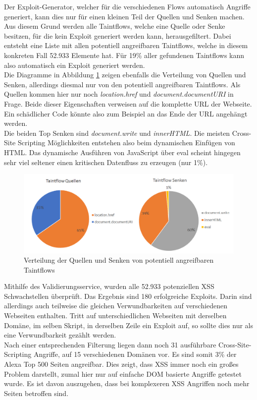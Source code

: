 Der Exploit-Generator, welcher für die verschiedenen Flows automatisch Angriffe generiert, kann dies nur für einen kleinen Teil der Quellen und Senken machen. Aus diesem Grund werden alle Taintflows, welche eine Quelle oder Senke besitzen, für die kein Exploit generiert werden kann, herausgefiltert. Dabei entsteht eine Liste mit allen potentiell angreifbaren Taintflows, welche in diesem konkreten Fall 52.933 Elemente hat. Für 19\% aller gefundenen Taintflows kann also automatisch ein Exploit generiert werden. \\
Die Diagramme in Abbildung \ref{fig:VerteilungQuellenSenkenAngreifbar} zeigen ebenfalls die Verteilung von Quellen und Senken, allerdings diesmal nur von den potentiell angreifbaren Taintflows. Als Quellen kommen hier nur noch \textit{location.href} und \textit{document.documentURI} in Frage. Beide dieser Eigenschaften verweisen auf die komplette URL der Webseite. Ein schädlicher Code könnte also zum Beispiel an das Ende der URL angehängt werden. \\
Die beiden Top Senken sind \textit{document.write} und \textit{innerHTML}. Die meisten Cross-Site Scripting Möglichkeiten entstehen also beim dynamischen Einfügen von HTML. Das dynamische Ausführen von JavaScript über eval scheint hingegen sehr viel seltener einen kritischen Datenfluss zu erzeugen (nur 1\%). 

\begin{figure}[h]
	\centering
	\includegraphics[width=1\textwidth]{Bilder/Diagram2.png}
	\caption{Verteilung der Quellen und Senken von potentiell angreifbaren Taintflows}
	\label{fig:VerteilungQuellenSenkenAngreifbar}
\end{figure}

Mithilfe des Validierungsservice, wurden alle 52.933 potenziellen XSS Schwachstellen überprüft. Das Ergebnis sind 180 erfolgreiche Exploits. Darin sind allerdings auch teilweise die gleichen Verwundbarkeiten auf verschiedenen Webseiten enthalten. Tritt auf unterschiedlichen Webseiten mit derselben Domäne, im selben Skript, in derselben Zeile ein Exploit auf, so sollte dies nur als eine Verwundbarkeit gezählt werden. \\
Nach einer entsprechenden Filterung liegen dann noch 31 ausführbare Cross-Site-Scripting Angriffe, auf 15 verschiedenen Domänen vor. Es sind somit 3\% der Alexa Top 500 Seiten angreifbar. Dies zeigt, dass XSS immer noch ein großes Problem darstellt, zumal hier nur auf einfache DOM basierte Angriffe getestet wurde. Es ist davon auszugehen, dass bei komplexeren XSS Angriffen noch mehr Seiten betroffen sind.

